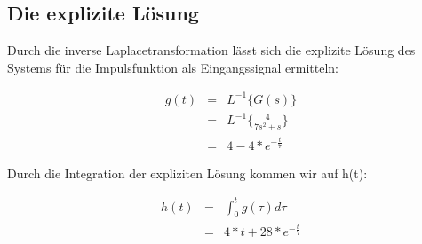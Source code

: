 \subsection{Die explizite Lösung}

Durch die inverse Laplacetransformation lässt sich die explizite Lösung des Systems für die Impulsfunktion als Eingangssignal ermitteln:

\begin{eqnarray*}
	g(t) &=& L^{-1}\{G(s)\}  \\ 
	&=& L^{-1}\{\frac{4}{7s^2 + s}\}\\
	&=& 4 - 4*e^{-\frac{t}{7}}
\end{eqnarray*}


Durch die Integration der expliziten Lösung kommen wir auf h(t):

\begin{eqnarray*}
	h(t) &=& \int_{0}^{t}g(\tau)d\tau \\ 
	&=& 4 * t + 28*e^{-\frac{t}{7}}
\end{eqnarray*}